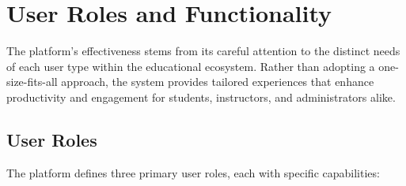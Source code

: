 \documentclass[12pt,a4paper]{article}
\begin{document}
\section{User Roles and Functionality}

The platform's effectiveness stems from its careful attention to the distinct needs of each user type within the educational ecosystem. Rather than adopting a one-size-fits-all approach, the system provides tailored experiences that enhance productivity and engagement for students, instructors, and administrators alike.

\subsection{User Roles}

The platform defines three primary user roles, each with specific capabilities:
\end{document}
